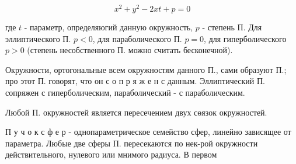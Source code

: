 \documentclass[10pt]{article}
\begin{document}
\[

x^{2}+y^{2}-2 x t+p=0

\]



где $t$ - параметр, определяюгий данную окружность, $p$ - степень П. Для эллиптического П. $p<0$, для параболического П. $p=0$, для гиперболического $p>0$ (степень несобственного П. можно считать бесконечной).



Окружности, ортогональные всем окружностям данного П., сами образуют П.; про этот П. говорят, что он с о п р я ж е н с данным. Эллиптический П. сопряжен с гиперболическим, параболический - с параболическим.



Любой П. окружностей является пересечением двух сөязок окружностей.



П у ч о к с ф е р - однопараметрическое семейство сфер, линейно зависящее от параметра. Любые две сферы П. пересекаются по нек-рой окружности действительного, нулевого или мнимого радиуса. В первом
\end{document}

